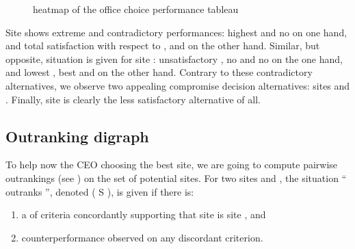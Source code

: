 \documentclass[a4paper,12pt,english]{sphinxhowto}
\let\sphinxpxdimen\pdfpxdimen\else\newdimen\sphinxpxdimen
\begin{document}
\begin{figure}[H]
\centering
\capstart

\noindent\sphinxincludegraphics[width=500\sphinxpxdimen]{{officeChoiceHeatmap}.png}
\caption{heatmap of the office choice performance tableau}\label{\detokenize{tutorial:id123}}\end{figure}

Site  shows extreme and contradictory performances: highest  and no  on one hand, and total satisfaction with respect to ,  and  on the other hand. Similar, but opposite, situation is given for site : unsatisfactory , no  and no  on the one hand, and lowest , best  and  on the other hand. Contrary to these contradictory alternatives, we observe two appealing compromise decision alternatives: sites  and . Finally, site  is clearly the less satisfactory alternative of all.


\subsection{Outranking digraph}
\label{\detokenize{tutorial:id48}}
To help now the CEO choosing the best site, we are going to compute pairwise outrankings (see ) on the set of potential sites. For two sites  and , the situation “ outranks ”, denoted ( S ), is given if there is:
\begin{enumerate}
%
\item {} 
a  of criteria concordantly supporting that site  is  site , and

\item {} 
 counter\sphinxhyphen{}performance observed on any discordant criterion.

\end{enumerate}
\end{document}
